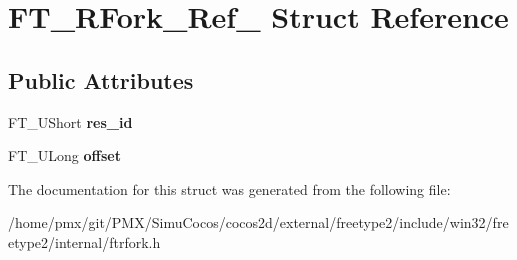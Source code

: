 \hypertarget{structFT__RFork__Ref__}{}\section{F\+T\+\_\+\+R\+Fork\+\_\+\+Ref\+\_\+ Struct Reference}
\label{structFT__RFork__Ref__}
\subsection*{Public Attributes}
\begin{DoxyCompactItemize}
\item 
\mbox{\label{structFT__RFork__Ref___a7bca14bddf56df7903166b52e19a0500}} 
F\+T\+\_\+\+U\+Short {\bfseries res\+\_\+id}
\item 
\mbox{\label{structFT__RFork__Ref___af84c349a29b40c42a788927b113f9ecf}} 
F\+T\+\_\+\+U\+Long {\bfseries offset}
\end{DoxyCompactItemize}


The documentation for this struct was generated from the following file\+:\begin{DoxyCompactItemize}
\item 
/home/pmx/git/\+P\+M\+X/\+Simu\+Cocos/cocos2d/external/freetype2/include/win32/freetype2/internal/ftrfork.\+h\end{DoxyCompactItemize}
